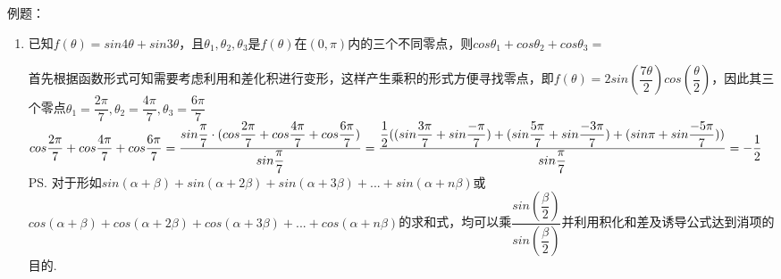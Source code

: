例题：
\begin{enumerate}
    \item 已知$f(\theta) = sin4\theta + sin3\theta$，且$\theta_1, \theta_2, \theta_3$是$f(\theta)$在$(0, \pi)$内的三个不同零点，则$cos\theta_1+cos\theta_2+cos\theta_3 = $
    \begin{jieda}
        首先根据函数形式可知需要考虑利用和差化积进行变形，这样产生乘积的形式方便寻找零点，即$f(\theta) = 2sin(\dfrac{7\theta}{2})cos(\dfrac{\theta}{2})$，因此其三个零点$\theta_1 = \dfrac{2\pi}{7}, \theta_2 = \dfrac{4\pi}{7}, \theta_3 = \dfrac{6\pi}{7}$ \\
        $cos\dfrac{2\pi}{7}+cos\dfrac{4\pi}{7}+cos\dfrac{6\pi}{7} = \dfrac{sin\dfrac{\pi}{7} \cdot (cos\dfrac{2\pi}{7}+cos\dfrac{4\pi}{7}+cos\dfrac{6\pi}{7})}{sin\dfrac{\pi}{7}} \\
        = \dfrac{\dfrac{1}{2}((sin\dfrac{3\pi}{7}+ sin\dfrac{-\pi}{7})+(sin\dfrac{5\pi}{7} + sin\dfrac{-3\pi}{7}) + (sin\pi + sin\dfrac{-5\pi}{7}))}{sin\dfrac{\pi}{7}} = -\dfrac{1}{2}$ \\
        \ps 对于形如$sin(\alpha + \beta) + sin(\alpha + 2\beta) + sin(\alpha + 3\beta) + ... + sin(\alpha + n\beta)$或$cos(\alpha + \beta) + cos(\alpha + 2\beta) + cos(\alpha + 3\beta) + ... + cos(\alpha + n\beta)$的求和式，均可以乘$\dfrac{sin(\dfrac{\beta}{2})}{sin(\dfrac{\beta}{2})}$并利用积化和差及诱导公式达到消项的目的.
    \end{jieda}
    

\end{enumerate}
